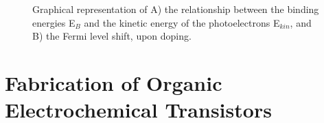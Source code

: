 \begin{figure}[ht]
	\centering
	\hspace{2em}
	\caption[Representation of the Fermi level shift upon doping]{ Graphical representation of A) the relationship between the binding energies E$_{B}$ and the kinetic energy of the photoelectrons E$_{kin}$, and B) the Fermi level shift, upon doping.} 
	\label{fig:ups}
\end{figure}


\section{Fabrication of Organic Electrochemical Transistors}

